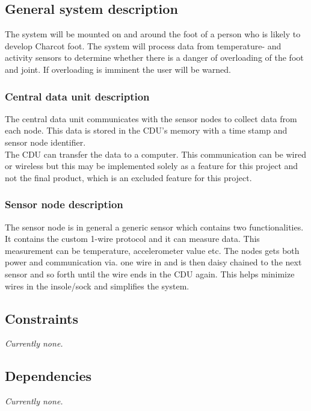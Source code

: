 \subsection{General system description}
The system will be mounted on and around the foot of a person who is likely to develop Charcot foot. The system will process data from temperature- and activity sensors to determine whether there is a danger of overloading of the foot and joint. If overloading is imminent the user will be warned.

\subsubsection{Central data unit description}
The central data unit communicates with the sensor nodes to collect data from each node. This data is stored in the CDU's memory with a time stamp and sensor node identifier.\\
The CDU can transfer the data to a computer. This communication can be wired or wireless but this may be implemented solely as a feature for this project and not the final product, which is an excluded feature for this project.

\subsubsection{Sensor node description}
The sensor node is in general a generic sensor which contains two functionalities. It contains the custom 1-wire protocol and it can measure data. This measurement can be temperature, accelerometer value etc. The nodes gets both power and communication via. one wire in and is then daisy chained to the next sensor and so forth until the wire ends in the CDU again. This helps minimize wires in the insole/sock and simplifies the system. 

\subsection{Constraints}
\textit{Currently none.}
\subsection{Dependencies}
\textit{Currently none.}


